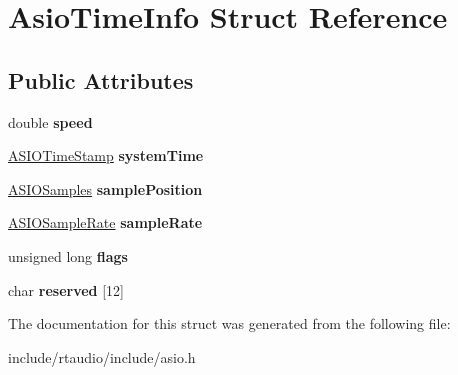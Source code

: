 \hypertarget{struct_asio_time_info}{}\section{Asio\+Time\+Info Struct Reference}
\label{struct_asio_time_info}
\subsection*{Public Attributes}
\begin{DoxyCompactItemize}
\item 
double {\bfseries speed}\hypertarget{struct_asio_time_info_a69662233b88de4269ca44d493276e0c4}{}\label{struct_asio_time_info_a69662233b88de4269ca44d493276e0c4}

\item 
\hyperlink{struct_a_s_i_o_time_stamp}{A\+S\+I\+O\+Time\+Stamp} {\bfseries system\+Time}\hypertarget{struct_asio_time_info_ac78a0b087c8e23a8503ffca441fc9372}{}\label{struct_asio_time_info_ac78a0b087c8e23a8503ffca441fc9372}

\item 
\hyperlink{struct_a_s_i_o_samples}{A\+S\+I\+O\+Samples} {\bfseries sample\+Position}\hypertarget{struct_asio_time_info_a73e72ab10d4adb95f4d99423c5205a5b}{}\label{struct_asio_time_info_a73e72ab10d4adb95f4d99423c5205a5b}

\item 
\hyperlink{struct_a_s_i_o_sample_rate}{A\+S\+I\+O\+Sample\+Rate} {\bfseries sample\+Rate}\hypertarget{struct_asio_time_info_ac6b6a791f5ec247ec20a5a0737e165e7}{}\label{struct_asio_time_info_ac6b6a791f5ec247ec20a5a0737e165e7}

\item 
unsigned long {\bfseries flags}\hypertarget{struct_asio_time_info_a9e96b3641875babd1e3e719ee1b6ca14}{}\label{struct_asio_time_info_a9e96b3641875babd1e3e719ee1b6ca14}

\item 
char {\bfseries reserved} \mbox{[}12\mbox{]}\hypertarget{struct_asio_time_info_ad5ad9e00134a9397f5ea7da0d284bd91}{}\label{struct_asio_time_info_ad5ad9e00134a9397f5ea7da0d284bd91}

\end{DoxyCompactItemize}


The documentation for this struct was generated from the following file\+:\begin{DoxyCompactItemize}
\item 
include/rtaudio/include/asio.\+h\end{DoxyCompactItemize}
